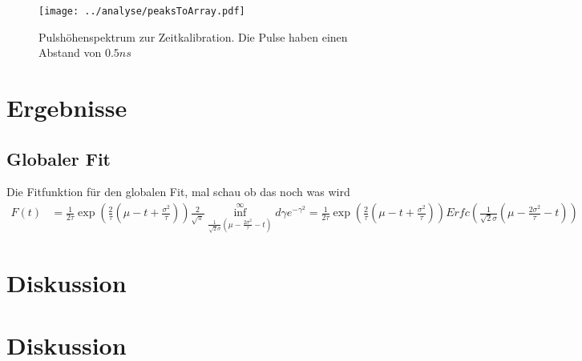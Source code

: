 \documentclass[a4paper,12pt]{article}
\begin{document}
		\begin{figure}
		\texttt{[image: ../analyse/peaksToArray.pdf]}
		\caption{Pulshöhenspektrum zur Zeitkalibration. Die Pulse haben einen Abstand von $0.5\si{ns}$}
		\label{fig:timepuls}
		\end{figure}
\section{Ergebnisse}
\subsection{Globaler Fit}
Die Fitfunktion für den globalen Fit, mal schau ob das noch was wird
\begin{align*}
	F(t) &= \frac{1}{2τ} \exp\left( \frac{2}{τ}\left( μ-t+\frac{σ^2}{τ} \right) \right) \frac{2}{\sqrt{π}}\inf_{\frac{1}{\sqrt{2}σ}\left( μ-\frac{2σ^2}{τ} -t \right)}^\infty dγ e^{-γ^2}
	= \frac{1}{2τ} \exp\left( \frac{2}{τ}\left( μ-t+\frac{σ^2}{τ} \right) \right) Erfc\left(\frac{1}{\sqrt{2}σ}\left( μ-\frac{2σ^2}{τ} -t \right)\right)
\end{align*}
\section{Diskussion}

 
\section{Diskussion} 
\end{document}
